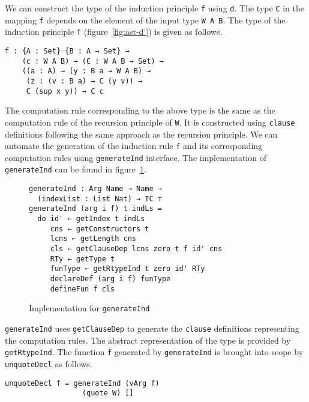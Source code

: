 \documentclass[sigplan,10pt]{acmart}
\begin{document}
We can construct the type of the induction principle {\tt f} using {\tt d}. The type {\tt C} in the mapping {\tt f} depends on the element of the input type {\tt W A B}. The type of the induction principle {\tt f} (figure~\ref{fig:ast-d'}) is given as follows.
\begin{center}
\begingroup
\begin{BVerbatim}
f : {A : Set} {B : A → Set} → 
    (c : W A B) → (C : W A B → Set) → 
    ((a : A) → (y : B a → W A B) → 
     (z : (v : B a) → C (y v)) → 
     C (sup x y)) → C c
\end{BVerbatim}
\endgroup
\end{center}
The computation rule corresponding to the above type is the same as the computation rule of the recursion principle of {\tt W}. It is constructed using {\tt clause} definitions following the same approach as the recursion principle.  We can automate the generation of the induction rule {\tt f} and its corresponding computation rules using {\tt generateInd} interface. The implementation of {\tt generateInd} can be found in figure~\ref{fig:generateInd}.


\begin{figure}
\begin{center}
\begingroup
\fontsize{7pt}{9pt}\selectfont
\begin{Verbatim}
generateInd : Arg Name → Name → 
  (indexList : List Nat) → TC ⊤
generateInd (arg i f) t indLs =
  do id' ← getIndex t indLs
     cns ← getConstructors t
     lcns ← getLength cns
     cls ← getClauseDep lcns zero t f id' cns
     RTy ← getType t
     funType ← getRtypeInd t zero id' RTy
     declareDef (arg i f) funType
     defineFun f cls
\end{Verbatim}
\endgroup
\end{center}
\caption{Implementation for {\tt generateInd}}
\label{fig:generateInd}
\end{figure}
\normalsize


{\tt generateInd} uses {\tt getClauseDep} to generate the {\tt clause} definitions representing the computation rules. The abstract representation of the type is provided by {\tt getRtypeInd}. The function {\tt f} generated by {\tt generateInd} is brought into scope by {\tt unquoteDecl} as follows.
\begin{center}
\begingroup
\begin{BVerbatim}
unquoteDecl f = generateInd (vArg f) 
                  (quote W) []
\end{BVerbatim}
\endgroup
\end{center}
\end{document}

